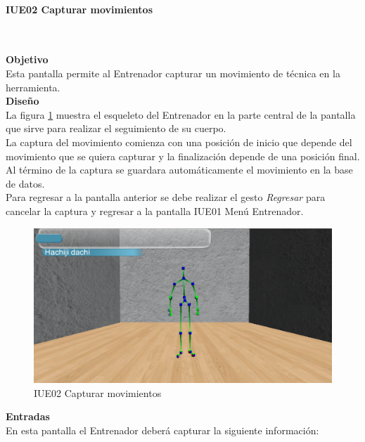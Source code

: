 \paragraph{IUE02 Capturar movimientos} \hspace{1cm}\\ 
\label{pant:IUE02} 

\textbf{\textcolor[rgb]{0, 0, 0.545098}{Objetivo}}\\
Esta pantalla permite al Entrenador capturar un movimiento de técnica en la herramienta.\\

\textbf{\textcolor[rgb]{0, 0, 0.545098}{Diseño}}\\
La figura \ref{fig:IUE02} muestra el esqueleto del Entrenador en la parte central de la pantalla que sirve para realizar el seguimiento de su cuerpo.\\

La captura del movimiento comienza con una posición de inicio que depende del movimiento que se quiera capturar y la finalización depende de una posición final. Al término de la captura se guardara automáticamente el movimiento en la base de datos.\\

Para regresar a la pantalla anterior se debe realizar el gesto \textit{Regresar} para cancelar la captura y regresar a la pantalla IUE01 Menú Entrenador.

\begin{figure}[H]
	\centering
		\includegraphics[scale=0.5]{./Figuras/Pantallas/IUE02Capturar_movimientos}
	\caption{IUE02 Capturar movimientos}
	\label{fig:IUE02}
\end{figure}

\textbf{\textcolor[rgb]{0, 0, 0.545098}{Entradas}}\\
En esta pantalla el Entrenador deberá capturar la siguiente información:

